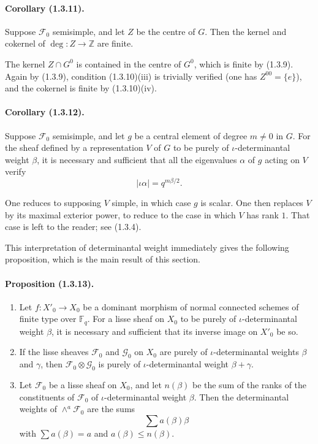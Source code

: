 \documentclass[11pt]{article}
\theoremstyle{remark}
\newcommand{\ZZ}{\mathbb{Z}}
\newcommand{\Fq}{\mathbb{F}_q}
\begin{document}
\paragraph{Corollary (1.3.11).} Suppose $\mathcal F_0$ semisimple, and let $Z$ be the centre of $G$. Then the kernel and cokernel of $\deg:Z\to\ZZ$ are finite.

The kernel $Z\cap G^0$ is contained in the centre of $G^0$, which is finite by (1.3.9). Again by (1.3.9), condition (1.3.10)(iii) is trivially verified (one has $Z^{00}=\{e\}$), and the cokernel is finite by (1.3.10)(iv).

\paragraph{Corollary (1.3.12).} Suppose $\mathcal F_0$ semisimple, and let $g$ be a central element of degree $m\ne0$ in $G$. For the sheaf defined by a representation $V$ of $G$ to be purely of $\iota$-determinantal weight $\beta$, it is necessary and sufficient that all the eigenvalues $\alpha$ of $g$ acting on $V$ verify
\[
|\iota\alpha|=q^{m\beta/2}.
\]

One reduces to supposing $V$ simple, in which case $g$ is scalar. One then replaces $V$ by its maximal exterior power, to reduce to the case in which $V$ has rank $1$. That case is left to the reader; see (1.3.4).

This interpretation of determinantal weight immediately gives the following proposition, which is the main result of this section.

\paragraph{Proposition (1.3.13).}
\begin{enumerate}[label=(\roman*)]
\item Let $f:X'_0\to X_0$ be a dominant morphism of normal connected schemes of finite type over $\Fq$. For a lisse sheaf on $X_0$ to be purely of $\iota$-determinantal weight $\beta$, it is necessary and sufficient that its inverse image on $X'_0$ be so.
\item If the lisse sheaves $\mathcal F_0$ and $\mathcal G_0$ on $X_0$ are purely of $\iota$-determinantal weights $\beta$ and $\gamma$, then $\mathcal F_0\otimes\mathcal G_0$ is purely of $\iota$-determinantal weight $\beta+\gamma$.
\item Let $\mathcal F_0$ be a lisse sheaf on $X_0$, and let $n(\beta)$ be the sum of the ranks of the constituents of $\mathcal F_0$ of $\iota$-determinantal weight $\beta$. Then the determinantal weights of $\wedge^a\mathcal F_0$ are the sums
\[
\sum a(\beta)\beta
\]
with $\sum a(\beta)=a$ and $a(\beta)\le n(\beta)$.
\end{enumerate}
\end{document}
